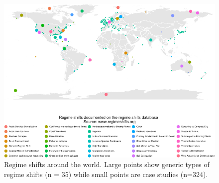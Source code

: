 \documentclass[9pt,]{article}
\begin{document}
\begin{figure}

{\centering \includegraphics{170830_draftCascadingEffects_files/figure-latex/Fig1-1} 

}

\caption{Regime shifts around the world. Large points show generic types of regime shifts (n = 35) while small points are case studies (n=324).}\label{fig:Fig1}
\end{figure}
\end{document}
